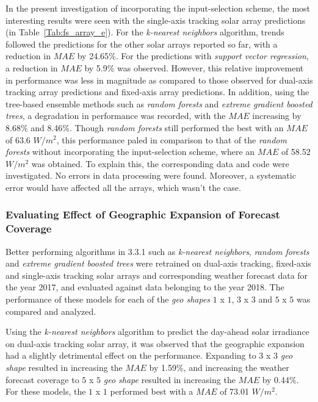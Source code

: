 \par In the present investigation of incorporating the input-selection scheme, the most interesting results were seen with the single-axis tracking solar array predictions (in Table~\ref{Tab:fs_array_e}). For the \textit{k-nearest neighbors} algorithm, trends followed the predictions for the other solar arrays reported so far, with a reduction in $MAE$ by 24.65\%. For the predictions with \textit{support vector regression}, a reduction in $MAE$ by 5.9\% was observed. However, this relative improvement in performance was less in magnitude as compared to those observed for dual-axis tracking array predictions and fixed-axis array predictions. In addition, using the tree-based ensemble methods such as \textit{random forests} and \textit{extreme gradient boosted trees}, a degradation in performance was recorded, with the $MAE$ increasing by 8.68\% and 8.46\%. Though \textit{random forests} still performed the best with an $MAE$ of 63.6 $W/m^2$, this performance paled in comparison to that of the \textit{random forests} without incorporating the input-selection scheme, where an $MAE$ of 58.52 $W/m^2$ was obtained. To explain this, the corresponding data and code were investigated. No errors in data processing were found. Moreover, a systematic error would have affected all the arrays, which wasn't the case. 


\subsubsection*{Evaluating Effect of Geographic Expansion of Forecast Coverage}
\par Better performing algorithms in 3.3.1 such as \textit{k-nearest neighbors}, \textit{random forests} and \textit{extreme gradient boosted trees} were retrained on dual-axis tracking, fixed-axis and single-axis tracking solar arrays and corresponding weather forecast data for the year 2017, and evaluated against data belonging to the year 2018. The performance of these models for each of the \textit{geo shapes} $1$ x $1$, $3$ x $3$ and $5$ x $5$ was compared and analyzed.

\par Using the \textit{k-nearest neighbors} algorithm to predict the day-ahead solar irradiance on dual-axis tracking solar array, it was observed that the geographic expansion had a slightly detrimental effect on the performance. Expanding to $3$ x $3$ \textit{geo shape} resulted in increasing the $MAE$ by 1.59\%, and increasing the weather forecast coverage to $5$ x $5$ \textit{geo shape} resulted in increasing the $MAE$ by 0.44\%. For these models, the $1$ x $1$ performed best with a $MAE$ of 73.01 $W/m^2$.

